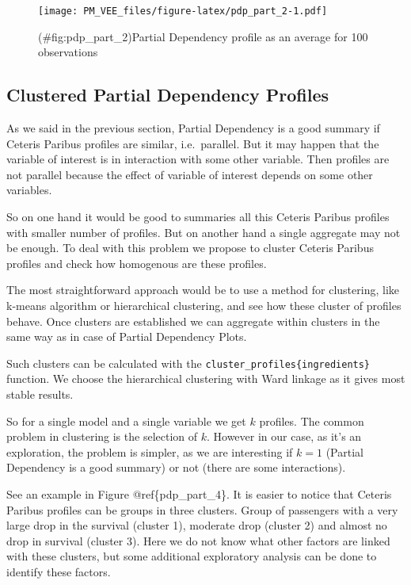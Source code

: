 \documentclass[12pt,]{krantz}
\theoremstyle{definition}
\theoremstyle{definition}
\theoremstyle{definition}
\theoremstyle{remark}
\begin{document}
\begin{figure}
\centering
\texttt{[image: PM\_VEE\_files/figure-latex/pdp\_part\_2-1.pdf]}
\caption{(\#fig:pdp\_part\_2)Partial Dependency profile as an average
for 100 observations}
\end{figure}

\hypertarget{clustered-partial-dependency-profiles}{%
\subsection{Clustered Partial Dependency
Profiles}\label{clustered-partial-dependency-profiles}}

As we said in the previous section, Partial Dependency is a good summary
if Ceteris Paribus profiles are similar, i.e.~parallel. But it may
happen that the variable of interest is in interaction with some other
variable. Then profiles are not parallel because the effect of variable
of interest depends on some other variables.

So on one hand it would be good to summaries all this Ceteris Paribus
profiles with smaller number of profiles. But on another hand a single
aggregate may not be enough. To deal with this problem we propose to
cluster Ceteris Paribus profiles and check how homogenous are these
profiles.

The most straightforward approach would be to use a method for
clustering, like k-means algorithm or hierarchical clustering, and see
how these cluster of profiles behave. Once clusters are established we
can aggregate within clusters in the same way as in case of Partial
Dependency Plots.

Such clusters can be calculated with the
\texttt{cluster\_profiles\{ingredients\}} function. We choose the
hierarchical clustering with Ward linkage as it gives most stable
results.

So for a single model and a single variable we get \(k\) profiles. The
common problem in clustering is the selection of \(k\). However in our
case, as it's an exploration, the problem is simpler, as we are
interesting if \(k=1\) (Partial Dependency is a good summary) or not
(there are some interactions).

See an example in Figure @ref\{pdp\_part\_4\}. It is easier to notice
that Ceteris Paribus profiles can be groups in three clusters. Group of
passengers with a very large drop in the survival (cluster 1), moderate
drop (cluster 2) and almost no drop in survival (cluster 3). Here we do
not know what other factors are linked with these clusters, but some
additional exploratory analysis can be done to identify these factors.
\end{document}

